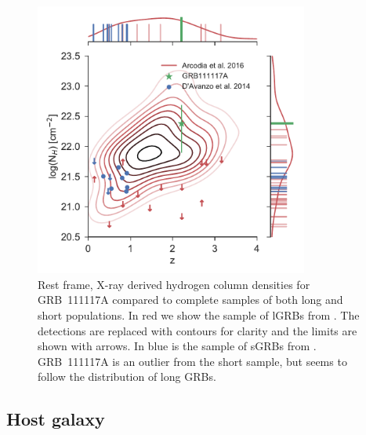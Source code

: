 \documentclass{aa}    %
\begin{document}
\begin{figure}
	\centering
	\includegraphics[width=9cm]{figures/NH_z.pdf}
	\caption{Rest frame, X-ray derived hydrogen column densities for GRB~111117A compared to complete samples of both long and short populations. In red we show the sample of lGRBs from \citet{Arcodia2016}. The detections are replaced with contours for clarity and the limits are shown with arrows. In blue is the sample of sGRBs from \citet{DAvanzo2014a}. GRB~111117A is an outlier from the short sample, but seems to follow the distribution of long GRBs.}
	\label{fig:NH_z}
\end{figure}



\subsection{Host galaxy}
\end{document}
